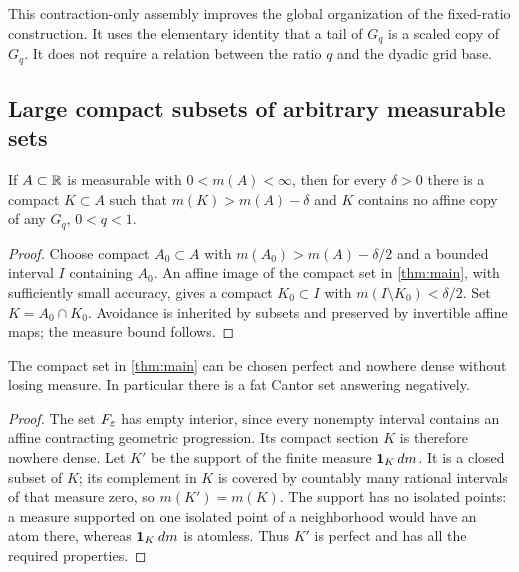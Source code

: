 This contraction-only assembly improves the global organization of
the fixed-ratio construction. It uses the elementary identity that a
tail of $G_q$ is a scaled copy of $G_q$. It does not require a relation
between the ratio $q$ and the dyadic grid base.

\subsection{Large compact subsets of arbitrary measurable sets}

\begin{corollary}\label{cor:inside}
If $A\subset\mathbb R$ is measurable with $0<m(A)<\infty$, then for every
$\delta>0$ there is a compact $K\subset A$ such that
$m(K)>m(A)-\delta$ and $K$ contains no affine copy of any $G_q$,
$0<q<1$.
\end{corollary}

\begin{proof}
Choose compact $A_0\subset A$ with $m(A_0)>m(A)-\delta/2$ and a
bounded interval $I$ containing $A_0$. An affine image of the compact
set in \cref{thm:main}, with sufficiently small accuracy, gives a
compact $K_0\subset I$ with $m(I\setminus K_0)<\delta/2$.
Set $K=A_0\cap K_0$. Avoidance is inherited by subsets and preserved
by invertible affine maps; the measure bound follows.
\end{proof}

\begin{corollary}\label{cor:fat-cantor}
The compact set in \cref{thm:main} can be chosen perfect and nowhere
dense without losing measure. In particular there is a fat Cantor
set answering \cite[Question~1]{BGKMW} negatively.
\end{corollary}

\begin{proof}
The set $F_\varepsilon$ has empty interior, since every nonempty interval
contains an affine contracting geometric progression. Its compact
section $K$ is therefore nowhere dense. Let $K'$ be the support of
the finite measure $\mathbf 1_K\,dm$. It is a closed subset of $K$;
its complement in $K$ is covered by countably many rational intervals
of that measure zero, so $m(K')=m(K)$. The support has no isolated
points: a measure supported on one isolated point of a neighborhood
would have an atom there, whereas $\mathbf 1_K\,dm$ is atomless.
Thus $K'$ is perfect and has all the required properties.
\end{proof}

